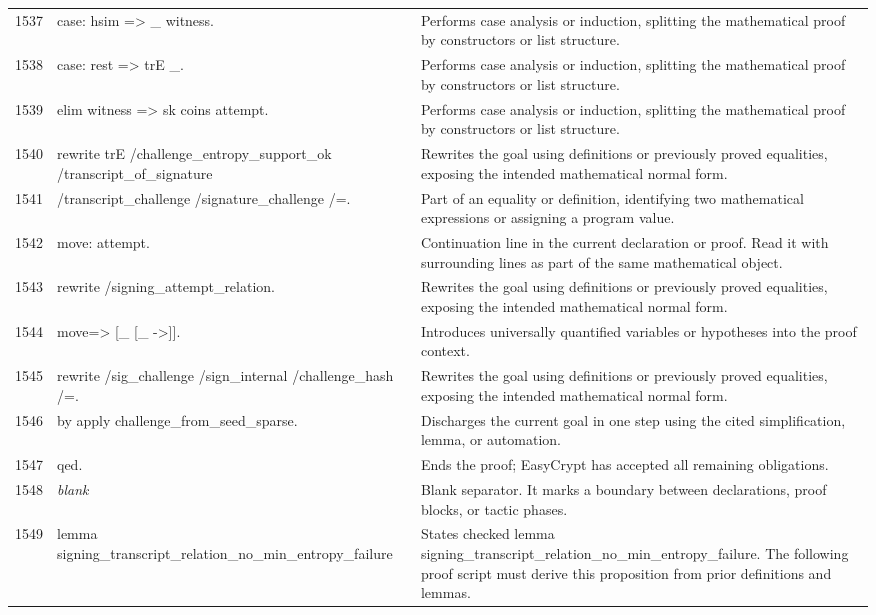 \documentclass[10pt]{article}
\begin{document}
\begin{longtable}{r L{0.53\textwidth} L{0.37\textwidth}}
1537 & {\ttfamily\scriptsize case: hsim => \_ witness.} & Performs case analysis or induction, splitting the mathematical proof by constructors or list structure. \\
1538 & {\ttfamily\scriptsize case: rest => trE \_.} & Performs case analysis or induction, splitting the mathematical proof by constructors or list structure. \\
1539 & {\ttfamily\scriptsize elim witness => sk coins attempt.} & Performs case analysis or induction, splitting the mathematical proof by constructors or list structure. \\
1540 & {\ttfamily\scriptsize rewrite trE /challenge\_entropy\_support\_ok /transcript\_of\_signature} & Rewrites the goal using definitions or previously proved equalities, exposing the intended mathematical normal form. \\
1541 & {\ttfamily\scriptsize         /transcript\_challenge /signature\_challenge /=.} & Part of an equality or definition, identifying two mathematical expressions or assigning a program value. \\
1542 & {\ttfamily\scriptsize move: attempt.} & Continuation line in the current declaration or proof.  Read it with surrounding lines as part of the same mathematical object. \\
1543 & {\ttfamily\scriptsize rewrite /signing\_attempt\_relation.} & Rewrites the goal using definitions or previously proved equalities, exposing the intended mathematical normal form. \\
1544 & {\ttfamily\scriptsize move=> [\_ [\_ ->]].} & Introduces universally quantified variables or hypotheses into the proof context. \\
1545 & {\ttfamily\scriptsize rewrite /sig\_challenge /sign\_internal /challenge\_hash /=.} & Rewrites the goal using definitions or previously proved equalities, exposing the intended mathematical normal form. \\
1546 & {\ttfamily\scriptsize by apply challenge\_from\_seed\_sparse.} & Discharges the current goal in one step using the cited simplification, lemma, or automation. \\
1547 & {\ttfamily\scriptsize qed.} & Ends the proof; EasyCrypt has accepted all remaining obligations. \\
1548 & {\ttfamily\scriptsize \emph{blank}} & Blank separator.  It marks a boundary between declarations, proof blocks, or tactic phases. \\
1549 & {\ttfamily\scriptsize lemma signing\_transcript\_relation\_no\_min\_entropy\_failure} & States checked lemma signing\_transcript\_relation\_no\_min\_entropy\_failure.  The following proof script must derive this proposition from prior definitions and lemmas. \\

\end{longtable}
\end{document}
